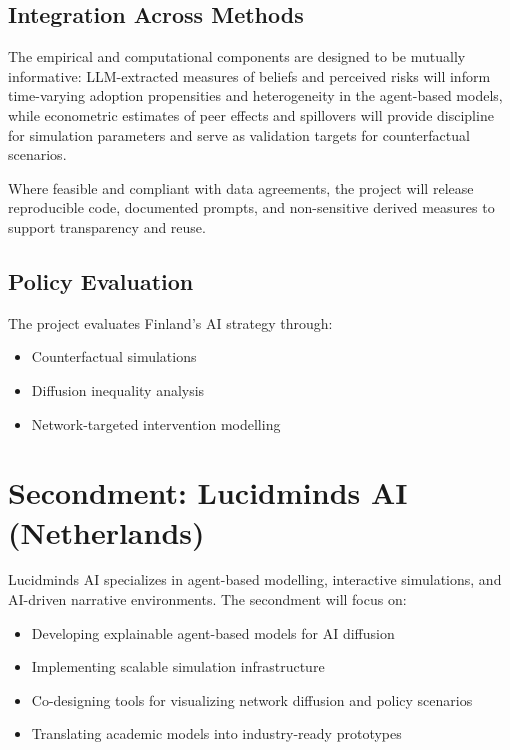 \documentclass{nfr}
\begin{document}
\subsection{Integration Across Methods}

The empirical and computational components are designed to be mutually informative: LLM-extracted measures of beliefs and perceived risks will inform time-varying adoption propensities and heterogeneity in the agent-based models, while econometric estimates of peer effects and spillovers will provide discipline for simulation parameters and serve as validation targets for counterfactual scenarios.

Where feasible and compliant with data agreements, the project will release reproducible code, documented prompts, and non-sensitive derived measures to support transparency and reuse.

\subsection{Policy Evaluation}

The project evaluates Finland’s AI strategy through:

\begin{itemize}
\item Counterfactual simulations
\item Diffusion inequality analysis
\item Network-targeted intervention modelling
\end{itemize}

\section{Secondment: Lucidminds AI (Netherlands)}

Lucidminds AI specializes in agent-based modelling, interactive simulations, and AI-driven narrative environments. The secondment will focus on:

\begin{itemize}
\item Developing explainable agent-based models for AI diffusion
\item Implementing scalable simulation infrastructure
\item Co-designing tools for visualizing network diffusion and policy scenarios
\item Translating academic models into industry-ready prototypes
\end{itemize}
\end{document}
